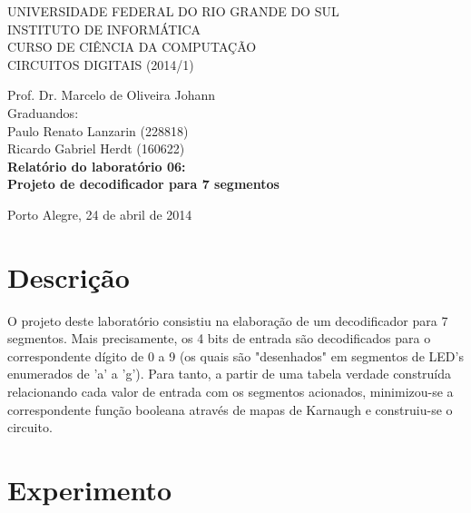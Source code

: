 \documentclass[a4paper]{article}
\begin{document}
\begin{titlepage}
\begin{center}


\large{ 
\uppercase{ Universidade Federal do Rio Grande do Sul\\

Instituto de Informática \\

Curso de Ciência da Computação \\

Circuitos Digitais (2014/1)\\
}

Prof. Dr. Marcelo de Oliveira Johann \\

Graduandos: \\ Paulo Renato Lanzarin (228818)
			\\ Ricardo Gabriel Herdt (160622) \\ [4.5cm]


\LARGE {\bfseries Relatório do laboratório 06: \\
	Projeto de decodificador para 7 segmentos\\[1.0cm]
}}


\vfill

Porto Alegre, 24 de abril de 2014

\end{center}
\end{titlepage}
\section{Descrição}

	O projeto deste laboratório consistiu na elaboração de um decodificador
para 7 segmentos. Mais precisamente, os 4 bits de entrada são decodificados
para o correspondente dígito de 0 a 9 (os quais são "desenhados" em segmentos
de LED's enumerados de 'a' a 'g'). Para tanto, a partir de uma tabela verdade
construída relacionando cada valor de entrada com os segmentos acionados,
minimizou-se a correspondente função booleana através de mapas de Karnaugh e
construiu-se o circuito.



\FloatBarrier
\section{Experimento}
\end{document}
